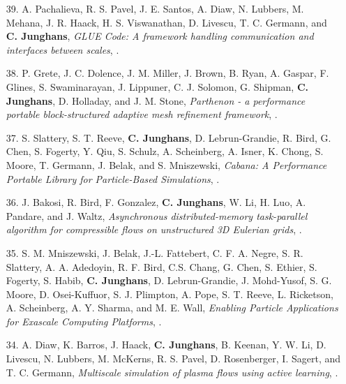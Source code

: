 \documentclass{article}
\begin{document}
\begin{enumerate}
\item[39.] A. Pachalieva, R. S. Pavel, J. E. Santos, A. Diaw, N. Lubbers, M. Mehana, J. R. Haack, H. S. Viswanathan, D. Livescu, T. C. Germann, and \textbf{C. Junghans},
   \textit{GLUE Code: A framework handling communication and interfaces between scales},
   .

\item[38.] P. Grete, J. C. Dolence, J. M. Miller, J. Brown, B. Ryan, A. Gaspar, F. Glines, S. Swaminarayan, J. Lippuner, C. J. Solomon, G. Shipman, \textbf{C. Junghans}, D. Holladay, and J. M. Stone,
   \textit{Parthenon - a performance portable block-structured adaptive mesh refinement framework},
   .

\item[37.] S. Slattery, S. T. Reeve, \textbf{C. Junghans}, D. Lebrun-Grandie, R. Bird, G. Chen, S. Fogerty, Y. Qiu, S. Schulz, A. Scheinberg, A. Isner, K. Chong, S. Moore, T. Germann, J. Belak, and S. Mniszewski,
   \textit{Cabana: A Performance Portable Library for Particle-Based Simulations},
   .

\item[36.] J. Bakosi, R. Bird, F. Gonzalez, \textbf{C. Junghans}, W. Li, H. Luo, A. Pandare, and J. Waltz,
  \textit{Asynchronous distributed-memory task-parallel algorithm for compressible flows on unstructured 3D Eulerian grids},
  .

\item[35.] S. M. Mniszewski, J. Belak, J.-L. Fattebert, C. F. A. Negre, S. R. Slattery, A. A. Adedoyin, R. F. Bird, C.S. Chang, G. Chen, S. Ethier, S. Fogerty, S. Habib, \textbf{C. Junghans}, D. Lebrun-Grandie, J. Mohd-Yusof, S. G. Moore, D. Osei-Kuffuor, S. J. Plimpton, A. Pope, S. T. Reeve, L. Ricketson, A. Scheinberg, A. Y. Sharma, and M. E. Wall,
  \textit{Enabling Particle Applications for Exascale Computing Platforms},
  .

\item[34.] A. Diaw, K. Barros, J. Haack, \textbf{C. Junghans}, B. Keenan, Y. W. Li, D. Livescu, N. Lubbers, M. McKerns, R. S. Pavel, D. Rosenberger, I. Sagert, and T. C. Germann, 
  \textit{Multiscale simulation of plasma flows using active learning},
  .


\end{enumerate}
\end{document}
